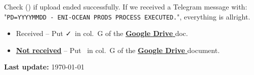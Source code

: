 \documentclass[twocolumn,8pt]{article}
\begin{document}
\begin{mdframed}[frametitle=(E)\ -- Around 11.50 am\hfill\faSunO]

Check (\faSend) if upload ended successfully. If we received a Telegram message with: "\texttt{PD=YYYYMMDD - ENI-OCEAN PRODS PROCESS EXECUTED.}", everything is allright.

\begin{itemize}\itemsep0pt
    \item[{\textcolor{ForestGreen}{\faCheckCircle}}] Received -- Put \faCheck\ in col.\ G of the \href{https://docs.google.com/spreadsheets/d/1XrbzNdr-K6jtwD-tTdRAlaO6S9hy3aSgxQ-OCmYEfL0/edit#gid=1550543264}{\textbf{Google Drive \faExternalLink}} doc. 
    
    \item[{\textcolor{Red}{\faTimesCircle}}] \ul{\textbf{Not received}} -- Put \faTimes\ in col.\ G of the \href{https://docs.google.com/spreadsheets/d/1XrbzNdr-K6jtwD-tTdRAlaO6S9hy3aSgxQ-OCmYEfL0/edit#gid=1550543264}{\textbf{Google Drive \faExternalLink}} document. 
\end{itemize}

\end{mdframed} 


    
    
    

{\hfill\footnotesize\textbf{Last update:} \today}
\end{document}
